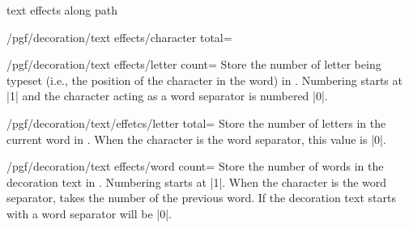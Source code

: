 \begin{decoration}{text effects along path}
\begin{key}{/pgf/decoration/text effects/character total=}
\begin{codeexample}[preamble={\usetikzlibrary{math}}]
\end{codeexample}
    \end{key}

    \begin{key}{/pgf/decoration/text effects/letter count=}
        Store the number of letter being typeset (i.e., the position of the
        character in the word) in . Numbering starts at |1| and the
        character acting as a word separator is numbered |0|.
\begin{codeexample}[]
\end{codeexample}
    \end{key}

    \begin{key}{/pgf/decoration/text/effetcs/letter total=}
        Store the number of letters in the current word in . When
        the character is the word separator, this value is |0|.
    \end{key}

    \begin{key}{/pgf/decoration/text effects/word count=}
        Store the number of words in the decoration text in .
        Numbering starts at |1|. When the character is the word separator,
         takes the number of the previous word. If the decoration
        text starts with a word separator  will be |0|.
\begin{codeexample}[]
\end{codeexample}
    \end{key}


\end{decoration}
